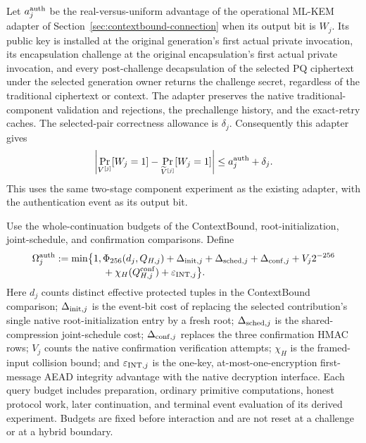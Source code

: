 Let $a_j^{\rm auth}$ be the real-versus-uniform advantage of the operational
ML-KEM adapter of Section~\ref{sec:contextbound-connection} when its output
bit is $W_j$.  Its public key is installed at the original generation's
first actual private invocation, its encapsulation challenge at the original
encapsulation's first actual private invocation, and every post-challenge decapsulation of
the selected PQ ciphertext under the selected generation owner returns the
challenge secret, regardless of the traditional ciphertext or context.
The adapter preserves the native traditional-component validation and
rejections, the prechallenge history, and the exact-retry caches.
The selected-pair correctness allowance is
$\delta_j$.  Consequently this adapter gives
\begin{equation}
 \left|\Pr_{V^{[j]}}[W_j=1]
       -\Pr_{\widetilde V^{[j]}}[W_j=1]\right|
 \le a_j^{\rm auth}+\delta_j.
 \label{eq:native-auth-component}
\end{equation}
This uses the same two-stage component experiment as the existing adapter,
with the authentication event as its output bit.

Use the whole-continuation budgets of the ContextBound, root-initialization,
joint-schedule, and confirmation comparisons.  Define
\begin{align}
 \Omega_j^{\rm auth}
 :=\min\bigl\{1,{}&
 \Phi_{256}(d_j,Q_{H,j})+\Delta_{{\rm init},j}
       +\Delta_{{\rm sched},j}+\Delta_{{\rm conf},j}
       +V_j2^{-256}\nonumber\\[-1mm]
       &+\chi_H(Q_{H,j}^{\rm conf})
       +\varepsilon_{{\rm INT},j}\bigr\}.
 \label{eq:native-auth-continuation}
\end{align}
Here $d_j$ counts distinct effective protected tuples in the ContextBound
comparison; $\Delta_{{\rm init},j}$ is the event-bit cost of replacing the
selected contribution's single native root-initialization entry by a fresh
root; $\Delta_{{\rm sched},j}$ is the shared-compression joint-schedule cost;
$\Delta_{{\rm conf},j}$ replaces the three confirmation HMAC rows;
$V_j$ counts the native confirmation verification attempts;
$\chi_H$ is the framed-input collision bound; and
$\varepsilon_{{\rm INT},j}$ is the one-key, at-most-one-encryption
first-message AEAD integrity advantage with the native decryption interface.
Each query budget includes preparation, ordinary primitive computations,
honest protocol work, later continuation, and terminal event evaluation of
its derived experiment.  Budgets are fixed before interaction and are not
reset at a challenge or at a hybrid boundary.

